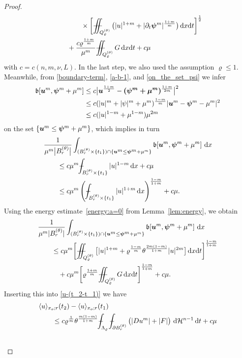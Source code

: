 \documentclass[a4paper, 10pt, american]{amsart}
\numberwithin{theorem}{section}
\numberwithin{equation}{section}
\newcommand{\dxdt}{\,\mathrm{d}x\mathrm{d}t}
\renewcommand{\d}{\,\mathrm{d}}
\newcommand{\dx}{\,\mathrm{d}x}
\newcommand{\dt}{\,\mathrm{d}t}
\renewcommand{\rho}{\varrho}
\newcommand{\power}[2]{\bm{#1^{\mbox{\unboldmath{\scriptsize$#2$}}}}}
\def\Xint#1{\mathchoice
    {\XXint\displaystyle\textstyle{#1}}%
    {\XXint\textstyle\scriptstyle{#1}}%
    {\XXint\scriptstyle\scriptscriptstyle{#1}}%
    {\XXint\scriptscriptstyle\scriptscriptstyle{#1}}%
    \!\int}
\def\XXint#1#2#3{\setbox0=\hbox{$#1{#2#3}{\int}$}
    \vcenter{\hbox{$#2#3$}}\kern-0.5\wd0}
\def\bint{\Xint-}
\def\Xiint#1{\mathchoice
    {\XXiint\displaystyle\textstyle{#1}}%
    {\XXiint\textstyle\scriptstyle{#1}}%
    {\XXiint\scriptstyle\scriptscriptstyle{#1}}%
    {\XXiint\scriptscriptstyle\scriptscriptstyle{#1}}%
    \!\iint}
\def\XXiint#1#2#3{\setbox0=\hbox{$#1{#2#3}{\iint}$}
    \vcenter{\hbox{$#2#3$}}\kern-0.5\wd0}
\def\biint{\Xiint{-\!-}}
\def\<{\langle}
\def\>{\rangle}
\begin{document}
\begin{proof}
\begin{align}
	&\quad\quad\quad\quad\times
	\bigg[\biint_{Q_\rho^{(\theta)}} \big( |u|^{1+m} + |\partial_t \power \psi {m}|^{\frac{1+m}m}\big) \dxdt\bigg]^{\frac{1}{2}}\\
	&\qquad
	+
	\frac{c\rho^\frac{1+m}m}{\mu^m}\biint_{Q_\rho^{(\theta)}}G
        \dxdt +c\mu
\end{align}
with $c=c(n,m,\nu,L)$. In the last step, we also used the assumption
$\rho\le1$. 
Meanwhile, from \eqref{boundary-term}, \eqref{a-b-1}, and
\eqref{on_the_set_psi} we infer 
\begin{align*}
\mathfrak{b}[\power um,\power\psi m+\mu^m]
&\le
c\big| \power u{\frac{1+m}2} - \power{(\psi^m + \mu^m)}{\frac{1+m}{2m}} \big|^2\\
&\le
c(|u|^m+|\psi|^m+\mu^m)^{\frac{1-m}m}|\power um-\power\psi m -\mu^m|^2\\
&\le
c(|u|^{1-m}+\mu^{1-m})\mu^{2m}
\end{align*}
on the set $\{\power um \le \power \psi m+\mu^m\}$, which implies in turn
\begin{align*}
&\frac1{\mu^m\big|B_r^{(\theta)}\big|}\int_{(B_r^{(\theta)}\times\{t_1\})\cap\{\power um \le \power \psi m+\mu^m\}}\mathfrak{b}[\power
  um,\power\psi m+\mu^m]\,\dx\\
&\qquad\le
c\mu^m\bint_{B_r^{(\theta)}\times \{t_1\}} |u|^{1-m} \dx + c\mu \\
&\qquad\le
c\mu^m\left(\bint_{B_r^{(\theta)}\times \{t_1\}} |u|^{1+m} \dx\right)^{\frac{1-m}{1+m}} + c\mu.
\end{align*}
Using the energy estimate~\eqref{energy:a=0} from
Lemma~\ref{lem:energy}, we obtain
\begin{align*}
&\frac1{\mu^m|B_r^{(\theta)}|}\int_{(B_r^{(\theta)}\times\{t_1\})\cap\{\power um \le \power \psi m+\mu^m\}}\mathfrak{b}[\power
  um,\power\psi m+\mu^m]\,\dx\\
&\qquad\le
c\mu^m\bigg[\biint_{Q_\rho^{(\theta)}} \big[|u|^{1+m} +
\rho^{\frac{1-m}m}\theta^{\frac{2m(1-m)}{1+m}} |u|^{2m}\big] \dxdt\bigg]^{\frac{1-m}{1+m}} \\
&\quad\qquad
+
c\mu^m\bigg[\rho^{\frac{1+m}m}\biint_{Q_{\rho}^{(\theta)}}G
\dxdt\bigg]^{\frac{1-m}{1+m}} + c\mu.
\end{align*}
Inserting this into \eqref{u-(t_2-t_1)} we have 
\begin{align}\label{u-(t_2-t_1)-2}\nonumber
&\<u\>_{x_o;r}(t_2)-\<u\>_{x_o;r}(t_1)\\\nonumber
&\qquad\le
c\rho^{\frac1m}\theta^{\frac{m(1-m)}{1+m}}\bint_{\Lambda_\rho}\bint_{\partial B_r^{(\theta)}} \big(|Du^m|+|F|\big)\,\d\mathcal{H}^{n-1}\dt +c\mu\\\nonumber

\end{align}
\end{proof}
\end{document}
